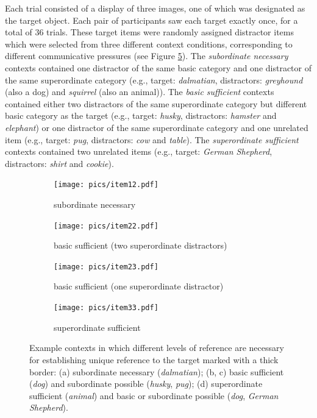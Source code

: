 \documentclass[11pt]{article}
\newcommand{\figref}[1]{Figure \ref{#1}}
\begin{document}
Each trial consisted of a display of three images, one of which was designated as the target object. Each pair of participants saw each target exactly once, for a total of 36 trials. These target items were randomly assigned distractor items which were selected from three different context conditions, corresponding to different communicative pressures (see \figref{fig:dogcontexts}). The \emph{subordinate necessary} contexts contained one distractor of the same basic category and one distractor of the same superordinate category (e.g., target: \emph{dalmatian}, distractors: \emph{greyhound} (also a dog) and \emph{squirrel} (also an animal)). The \emph{basic sufficient} contexts contained either two distractors of the same superordinate category but different basic category as the target (e.g., target: \emph{husky}, distractors: \emph{hamster} and \emph{elephant}) or one distractor of the same superordinate category and one unrelated item (e.g., target: \emph{pug}, distractors: \emph{cow} and \emph{table}). The \emph{superordinate sufficient} contexts contained two unrelated items (e.g., target: \emph{German Shepherd}, distractors: \emph{shirt} and \emph{cookie}). 

\begin{figure}
	\begin{subfigure}{.5\textwidth}
		\centering
		\texttt{[image: pics/item12.pdf]}
		\caption{subordinate necessary}
		\label{fig:item12}
	\end{subfigure}
	\begin{subfigure}{.5\textwidth}
		\centering
		\texttt{[image: pics/item22.pdf]}
		\centering
		\caption{basic sufficient (two superordinate distractors)}
		\label{fig:item22}
	\end{subfigure}
	\begin{subfigure}{.5\textwidth}
		\centering
		\texttt{[image: pics/item23.pdf]}
		\caption{basic sufficient (one superordinate distractor)}
		\label{fig:item23}
	\end{subfigure}
	\begin{subfigure}{.5\textwidth}
		\centering
		\texttt{[image: pics/item33.pdf]}
		\centering
		\caption{superordinate sufficient}
		\label{fig:item33}
	\end{subfigure}
	\caption{Example contexts in which different levels of reference are necessary for establishing unique reference to the target marked with a thick border: (a) subordinate necessary (\emph{dalmatian}); (b, c) basic sufficient (\emph{dog}) and subordinate possible (\emph{husky}, \emph{pug}); (d) superordinate sufficient (\emph{animal}) and basic or subordinate possible (\emph{dog}, \emph{German Shepherd}).}
	\label{fig:dogcontexts}
\end{figure}
\end{document}

